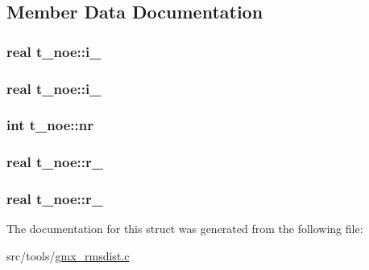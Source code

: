 \subsection{\-Member \-Data \-Documentation}
\hypertarget{structt__noe_a29b76076f8b0b21e9dae1e9ff344b917}{
\subsubsection[{i\-\_\-3}]{\setlength{\rightskip}{0pt plus 5cm}real {\bf t\-\_\-noe\-::i\-\_}}}\label{structt__noe_a29b76076f8b0b21e9dae1e9ff344b917}
\hypertarget{structt__noe_a0a33adaeea4660822af8be3a84282add}{
\subsubsection[{i\-\_\-6}]{\setlength{\rightskip}{0pt plus 5cm}real {\bf t\-\_\-noe\-::i\-\_}}}\label{structt__noe_a0a33adaeea4660822af8be3a84282add}
\hypertarget{structt__noe_aa823322694ad7756ff245c228d1cfe2a}{
\subsubsection[{nr}]{\setlength{\rightskip}{0pt plus 5cm}int {\bf t\-\_\-noe\-::nr}}}\label{structt__noe_aa823322694ad7756ff245c228d1cfe2a}
\hypertarget{structt__noe_afd19c1d6093e43bd4672fdf4fc4eec76}{
\subsubsection[{r\-\_\-3}]{\setlength{\rightskip}{0pt plus 5cm}real {\bf t\-\_\-noe\-::r\-\_}}}\label{structt__noe_afd19c1d6093e43bd4672fdf4fc4eec76}
\hypertarget{structt__noe_a69c7d2965b6fa70170a016fb5de4da16}{
\subsubsection[{r\-\_\-6}]{\setlength{\rightskip}{0pt plus 5cm}real {\bf t\-\_\-noe\-::r\-\_}}}\label{structt__noe_a69c7d2965b6fa70170a016fb5de4da16}


\-The documentation for this struct was generated from the following file\-:\begin{DoxyCompactItemize}
\item 
src/tools/\hyperlink{gmx__rmsdist_8c}{gmx\-\_\-rmsdist.\-c}\end{DoxyCompactItemize}
